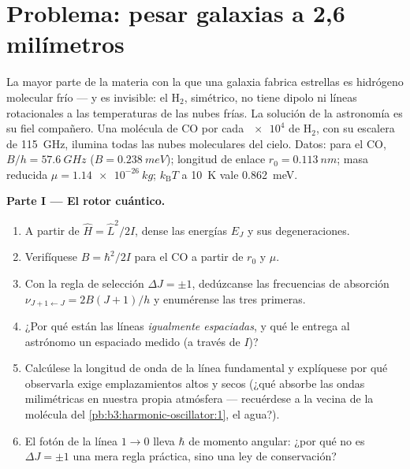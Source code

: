\section{Problema: pesar galaxias a 2,6 milímetros}

\begin{problem}\label{pb:b3:quantum-angular-momentum:1}
La mayor parte de la materia con la que una galaxia fabrica estrellas es
hidrógeno molecular frío --- y es invisible: el H$_2$, simétrico, no tiene
dipolo ni líneas rotacionales a las temperaturas de las nubes frías. La
solución de la astronomía es su fiel compañero. Una molécula de CO por cada
$\num{e4}$ de H$_2$, con su escalera de \qty{115}{GHz}, ilumina todas las
nubes moleculares del cielo. Datos: para el CO, $B/h = \qty{57.6}{GHz}$ ($B =
\qty{0.238}{meV}$); longitud de enlace $r_0 = \qty{0.113}{nm}$; masa
reducida $\mu = \qty{1.14e-26}{kg}$; $k_{\text{B}}T$ a \qty{10}{K} vale
\qty{0.862}{meV}.

\medskip\noindent\textbf{Parte I --- El rotor cuántico.}
\begin{enumerate}
  \item A partir de $\hat H = \hat L^2/2I$, dense las energías $E_J$ y
        sus degeneraciones.
  \item Verifíquese $B = \hbar^2/2I$ para el CO a partir de $r_0$ y $\mu$.
  \item Con la regla de selección $\Delta J = \pm1$, dedúzcanse las
        frecuencias de absorción $\nu_{J+1\leftarrow J} = 2B(J+1)/h$
        y enumérense las tres primeras.
  \item ¿Por qué están las líneas \emph{igualmente espaciadas}, y qué le
        entrega al astrónomo un espaciado medido (a través de $I$)?
  \item Calcúlese la longitud de onda de la línea fundamental y explíquese
        por qué observarla exige emplazamientos altos y secos (¿qué
        absorbe las ondas milimétricas en nuestra propia atmósfera
        --- recuérdese a la vecina de la molécula del
        \cref{pb:b3:harmonic-oscillator:1}, el agua?).
  \item El fotón de la línea $1 \to 0$ lleva $\hbar$ de momento
        angular: ¿por qué no es $\Delta J = \pm1$ una mera regla
        práctica, sino una ley de conservación?
\end{enumerate}


\end{problem}
